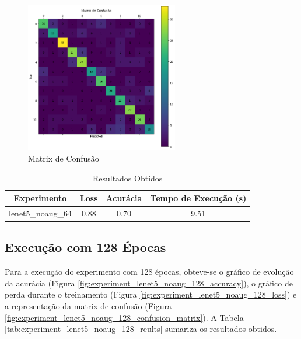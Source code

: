 \documentclass[12pt]{article}
\begin{document}
\begin{figure}[!htb]
  \centering
  \includegraphics[width=18em]{experiments/lenet5_noaug_64/confusion_matrix.png}
  \caption{Matrix de Confusão}
  \label{fig:experiment_lenet5_noaug_64_confusion_matrix}
\end{figure}

\begin{table}[!htb]
  \centering
  \begin{tabular}{|c|c|c|c|}
    \hline
    \textbf{Experimento} & \textbf{Loss} & \textbf{Acurácia} & \textbf{Tempo de Execução (s)} \\ \hline
    lenet5\_noaug\_64    & 0.88          & 0.70              & 9.51                           \\ \hline
  \end{tabular}
  \caption{Resultados Obtidos}
  \label{tab:experiment_lenet5_noaug_64_reults}
\end{table}

\newpage

\subsection{Execução com 128 Épocas}

Para a execução do experimento com 128 épocas, obteve-se o gráfico de evolução da acurácia (Figura \ref{fig:experiment_lenet5_noaug_128_accuracy}), o gráfico de perda durante o treinamento (Figura \ref{fig:experiment_lenet5_noaug_128_loss}) e a representação da matrix de confusão (Figura \ref{fig:experiment_lenet5_noaug_128_confusion_matrix}). A Tabela \ref{tab:experiment_lenet5_noaug_128_reults} sumariza os resultados obtidos.
\end{document}
